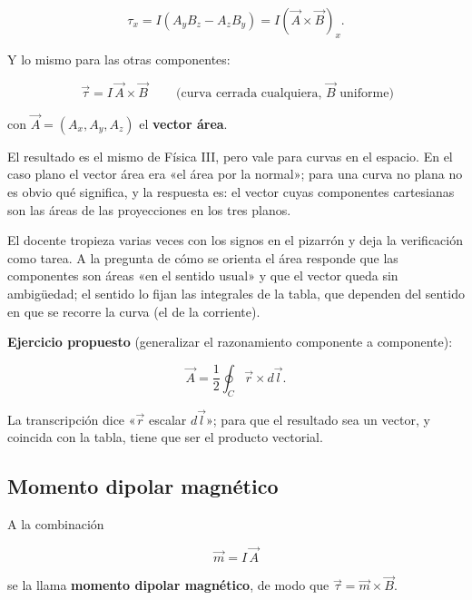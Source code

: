 \documentclass[12pt,a4paper]{article}
\begin{document}
\[
\tau_x = I\left(A_y B_z - A_z B_y\right) = I\left(\vec A\times\vec B\right)_x .
\]

Y lo mismo para las otras componentes:

\begin{keybox}
\[
\boxed{\ \vec\tau = I\,\vec A\times\vec B\ }
\qquad\text{(curva cerrada cualquiera, } \vec B \text{ uniforme)}
\]
\end{keybox}
con $\vec A = (A_x, A_y, A_z)$ el \textbf{vector área}.

\begin{notebox}
El resultado es el mismo de Física III, pero vale
para curvas en el espacio. En el caso plano el vector área era «el área por
la normal»; para una curva no plana no es obvio qué significa, y la respuesta
es: el vector cuyas componentes cartesianas son las áreas de las proyecciones
en los tres planos.
\end{notebox}

\begin{notebox}
El docente tropieza varias veces con los signos en el pizarrón y deja la
verificación como tarea. A la pregunta de cómo se orienta el área responde
que las componentes son áreas «en el sentido usual» y que el vector queda sin
ambigüedad; el sentido lo fijan las integrales de la tabla, que dependen del
sentido en que se recorre la curva (el de la corriente).
\end{notebox}

\textbf{Ejercicio propuesto} (generalizar el razonamiento componente a componente):

\[
\vec A = \frac12\oint_C \vec r\times d\vec l .
\]

\begin{notebox}
La transcripción dice «$\vec r$ escalar $d\vec l$»; para que el resultado sea
un vector, y coincida con la tabla, tiene que ser el producto vectorial.
\end{notebox}

\subsection{Momento dipolar magnético}

A la combinación

\begin{keybox}
\[
\boxed{\ \vec m = I\,\vec A\ }
\]
\end{keybox}
se la llama \textbf{momento dipolar magnético}, de modo que
$\vec\tau = \vec m\times\vec B$.
\end{document}
